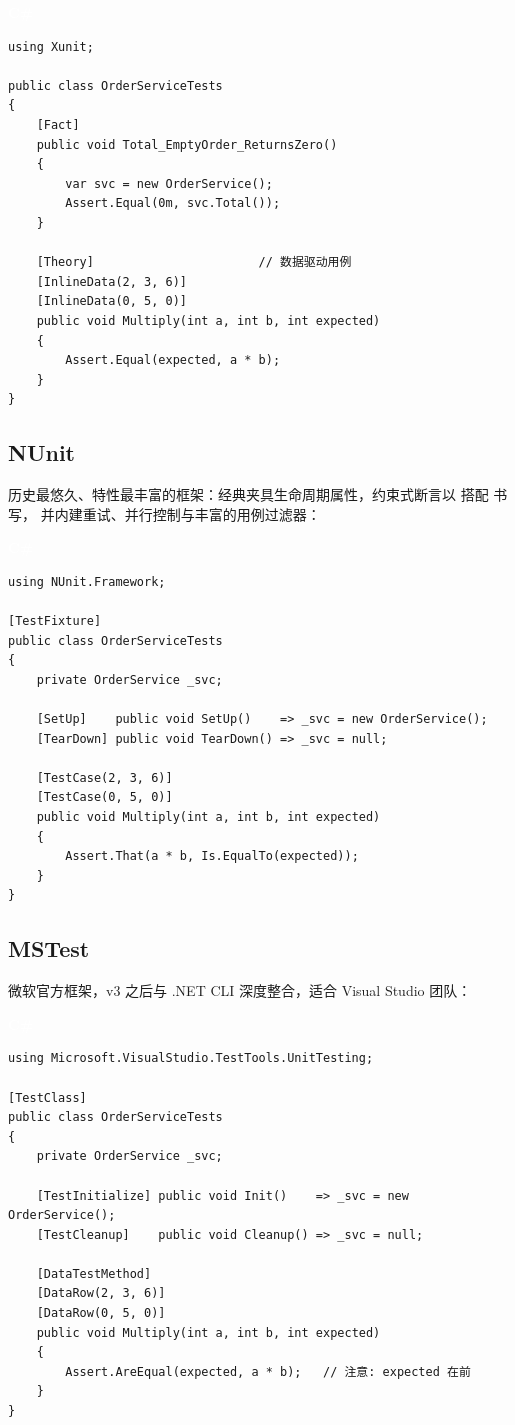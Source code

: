 \documentclass[12pt,a4paper,fontset=fandol]{ctexbook}
\newcommand{\csharplabel}{%
  \begin{tcolorbox}[enhanced,colback=csharpheadbg,colframe=csharpheadbg,
    arc=1mm,boxrule=0mm,left=6pt,right=6pt,top=2pt,bottom=2pt,
    halign=left,oversize]
    \textcolor{white}{\small\bfseries C\#}
  \end{tcolorbox}\vspace{-4pt}}
\begin{document}
\csharplabel
\begin{lstlisting}
using Xunit;

public class OrderServiceTests
{
    [Fact]
    public void Total_EmptyOrder_ReturnsZero()
    {
        var svc = new OrderService();
        Assert.Equal(0m, svc.Total());
    }

    [Theory]                       // 数据驱动用例
    [InlineData(2, 3, 6)]
    [InlineData(0, 5, 0)]
    public void Multiply(int a, int b, int expected)
    {
        Assert.Equal(expected, a * b);
    }
}
\end{lstlisting}

\subsection{NUnit}

历史最悠久、特性最丰富的框架：经典夹具生命周期属性，约束式断言以
 搭配  书写，
并内建重试、并行控制与丰富的用例过滤器：

\csharplabel
\begin{lstlisting}
using NUnit.Framework;

[TestFixture]
public class OrderServiceTests
{
    private OrderService _svc;

    [SetUp]    public void SetUp()    => _svc = new OrderService();
    [TearDown] public void TearDown() => _svc = null;

    [TestCase(2, 3, 6)]
    [TestCase(0, 5, 0)]
    public void Multiply(int a, int b, int expected)
    {
        Assert.That(a * b, Is.EqualTo(expected));
    }
}
\end{lstlisting}

\subsection{MSTest}

微软官方框架，v3 之后与 .NET CLI 深度整合，适合 Visual Studio 团队：

\csharplabel
\begin{lstlisting}
using Microsoft.VisualStudio.TestTools.UnitTesting;

[TestClass]
public class OrderServiceTests
{
    private OrderService _svc;

    [TestInitialize] public void Init()    => _svc = new OrderService();
    [TestCleanup]    public void Cleanup() => _svc = null;

    [DataTestMethod]
    [DataRow(2, 3, 6)]
    [DataRow(0, 5, 0)]
    public void Multiply(int a, int b, int expected)
    {
        Assert.AreEqual(expected, a * b);   // 注意: expected 在前
    }
}
\end{lstlisting}
\end{document}
